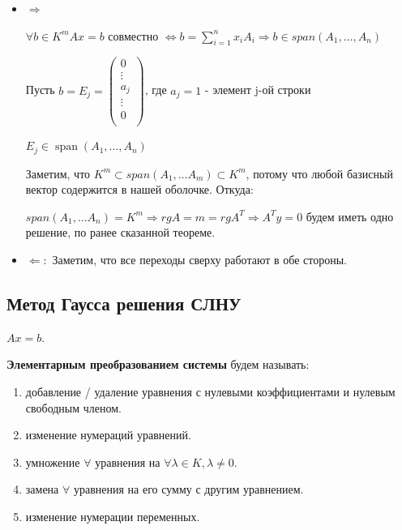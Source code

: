 \documentclass[twoside]{book}
\DeclareMathOperator{\spann}{span}
\begin{document}
\begin{itemize}
    \item \(\Rightarrow\)

          \(\forall b \in K^m Ax = b\) совместно \(\Leftrightarrow b = \sum\limits_{i=1}^n x_iA_i  \Rightarrow b \in span(A_1,\ldots,A_n)\)

          Пусть \(b = E_j = \begin{pmatrix}
              0 \\ \vdots\\a_j\\ \vdots\\ 0 \\
          \end{pmatrix}\), где \(a_j = 1\) - элемент j-ой строки

          \(E_j \in \spann(A_1,\ldots, A_n)\)

          Заметим, что \(K^m \subset span(A_1,\ldots A_m) \subset K^m\), потому что любой базисный вектор  содержится в нашей оболочке. Откуда:

          \(span(A_1,\ldots A_n)  = K^m \Rightarrow rg A = m = rg A^T \Rightarrow A^Ty=0\) будем иметь одно решение, по ранее сказанной теореме.

    \item \(\Leftarrow:\)
          Заметим, что все переходы сверху работают в обе стороны.

\end{itemize}

\subsection{Метод Гаусса решения СЛНУ}

\(Ax=b\).

\textbf{Элементарным преобразованием системы} будем называть:

\begin{enumerate}
    \item добавление / удаление уравнения с нулевыми коэффициентами и нулевым свободным членом.
    \item изменение нумераций уравнений.
    \item умножение \(\forall\) уравнения на \(\forall \lambda \in K, \lambda \neq 0\).
    \item замена \(\forall\) уравнения на его сумму с другим уравнением.
    \item изменение нумерации переменных.
\end{enumerate}
\end{document}
